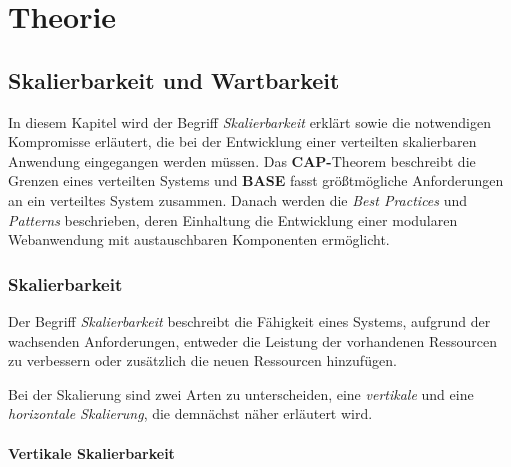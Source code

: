 \chapter{Theorie}
\section{Skalierbarkeit und Wartbarkeit}

In diesem Kapitel wird der Begriff \textit{Skalierbarkeit} erklärt sowie die notwendigen Kompromisse erläutert, die bei der Entwicklung einer verteilten skalierbaren Anwendung eingegangen werden müssen. Das \textbf{CAP-}Theorem beschreibt die Grenzen eines verteilten Systems und \textbf{BASE} fasst größtmögliche Anforderungen an ein verteiltes System zusammen. Danach werden die \textit{Best Practices} und \textit{Patterns} beschrieben, deren Einhaltung die Entwicklung einer modularen Webanwendung mit austauschbaren Komponenten ermöglicht. 

\subsection{Skalierbarkeit}\label{scale}
Der Begriff \textit{Skalierbarkeit} \cite{node} beschreibt die Fähigkeit eines Systems, aufgrund der wachsenden Anforderungen, entweder die Leistung der vorhandenen Ressourcen zu verbessern oder zusätzlich die neuen Ressourcen hinzufügen. %

Bei der Skalierung sind zwei Arten zu unterscheiden, eine \textit{vertikale} und eine \textit{horizontale Skalierung}, die demnächst näher erläutert wird.

\subsubsection{Vertikale Skalierbarkeit}

